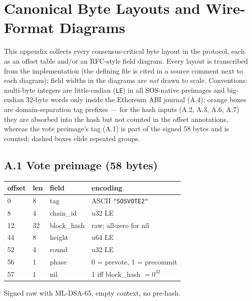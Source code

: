 \documentclass[11pt]{article}
\newcommand{\code}[1]{\texttt{#1}}
\newcommand{\mldsa}{ML\mbox{-}DSA\mbox{-}65}
\theoremstyle{plain}
\theoremstyle{definition}
\theoremstyle{remark}
\begin{document}
\appendix

\section{Canonical Byte Layouts and Wire-Format Diagrams}
\label{app:layouts}

This appendix collects every consensus-critical byte layout in the protocol,
each as an offset table and/or an RFC-style field diagram. Every layout is
transcribed from the implementation (the defining file is cited in a source
comment next to each diagram); field widths in the diagrams are
\emph{not} drawn to scale. Conventions: multi-byte integers are
little-endian (\code{LE}) in all SOS-native preimages and big-endian
32-byte words only inside the Ethereum ABI journal (A.4); orange boxes are
domain-separation tag prefixes --- for the hash inputs (A.2, A.3, A.6, A.7)
they are absorbed into the hash but not counted in the offset annotations,
whereas the vote preimage's tag (A.1) is part of the signed 58 bytes and is
counted; dashed boxes elide repeated groups.

\subsection*{A.1 \quad Vote preimage (58 bytes)}
\begin{center}
\begin{tabular}{@{}llll@{}}
\toprule
\textbf{offset} & \textbf{len} & \textbf{field} & \textbf{encoding} \\
\midrule
0  & 8  & tag            & ASCII \code{"SOSVOTE2"} \\
8  & 4  & chain\_id      & u32 LE \\
12 & 32 & block\_hash    & raw; all-zero for nil \\
44 & 8  & height         & u64 LE \\
52 & 4  & round          & u32 LE \\
56 & 1  & phase          & 0 = prevote, 1 = precommit \\
57 & 1  & nil            & 1 iff block\_hash $= 0^{32}$ \\
\bottomrule
\end{tabular}
\end{center}
Signed raw with \mldsa{}, empty context, no pre-hash.
\end{document}
